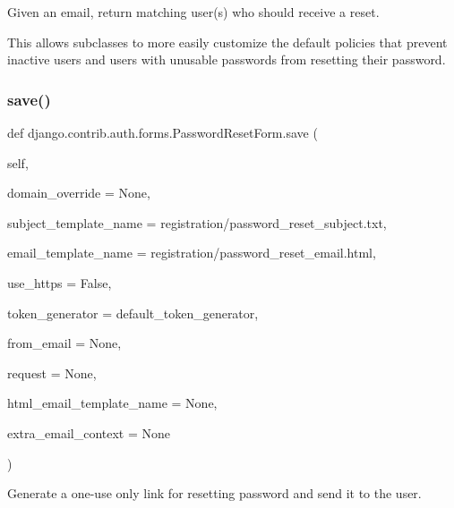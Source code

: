 \begin{DoxyVerb}Given an email, return matching user(s) who should receive a reset.

This allows subclasses to more easily customize the default policies
that prevent inactive users and users with unusable passwords from
resetting their password.
\end{DoxyVerb}
 \mbox{\label{classdjango_1_1contrib_1_1auth_1_1forms_1_1_password_reset_form_aa62f74e3dfa401f014669aaecf74c396}} 
\subsubsection{\texorpdfstring{save()}{save()}}
{\footnotesize\ttfamily def django.\+contrib.\+auth.\+forms.\+Password\+Reset\+Form.\+save (\begin{DoxyParamCaption}\item[{}]{self,  }\item[{}]{domain\+\_\+override = {\ttfamily None},  }\item[{}]{subject\+\_\+template\+\_\+name = {\ttfamily \textquotesingle{}registration/password\+\_\+reset\+\_\+subject.txt\textquotesingle{}},  }\item[{}]{email\+\_\+template\+\_\+name = {\ttfamily \textquotesingle{}registration/password\+\_\+reset\+\_\+email.html\textquotesingle{}},  }\item[{}]{use\+\_\+https = {\ttfamily False},  }\item[{}]{token\+\_\+generator = {\ttfamily default\+\_\+token\+\_\+generator},  }\item[{}]{from\+\_\+email = {\ttfamily None},  }\item[{}]{request = {\ttfamily None},  }\item[{}]{html\+\_\+email\+\_\+template\+\_\+name = {\ttfamily None},  }\item[{}]{extra\+\_\+email\+\_\+context = {\ttfamily None} }\end{DoxyParamCaption})}

\begin{DoxyVerb}Generate a one-use only link for resetting password and send it to the
user.
\end{DoxyVerb}
 \mbox{\label{classdjango_1_1contrib_1_1auth_1_1forms_1_1_password_reset_form_ae171285c9a365d3a40aed8c7fab6d8c7}} 
